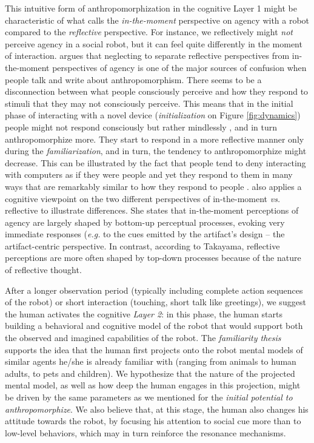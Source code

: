 \documentclass{frontiersSCNS} %
\newcommand{\eg}{\textit{e.g.}\xspace}
\newcommand{\vs}{\textit{vs.}\xspace}
\begin{document}
This intuitive form of anthropomorphization in the cognitive Layer 1 might be
characteristic of what \cite{takayama_perspectives_2012} calls the
\textit{in-the-moment} perspective on agency with a robot compared to the
\textit{reflective} perspective. For instance, we reflectively might
\textit{not} perceive agency in a social robot, but it can feel quite
differently in the moment of interaction. \cite{takayama_perspectives_2012}
argues that neglecting to separate reflective perspectives from in-the-moment
perspectives of agency is one of the major sources of confusion when people talk
and write about anthropomorphism. There seems to be a disconnection between what
people consciously perceive and how they respond to stimuli that they may not
consciously perceive. This means that in the initial phase of interacting with a
novel device (\textit{initialization} on Figure \ref{fig:dynamics}) people
might not respond consciously but rather mindlessly \citep{nass_machines_2000},
and in turn anthropomorphize more. They start to respond in a more reflective
manner only during the \textit{familiarization}, and in turn, the tendency to
anthropomorphize might decrease. This can be illustrated by the fact that
people tend to deny interacting with computers as if they were
people and yet they respond to them in many ways that are remarkably
similar to how they respond to people \citep{reeves_media_1996}.
\cite{takayama_perspectives_2012} also applies a cognitive viewpoint on the two
different perspectives of in-the-moment \vs reflective to illustrate
differences. She states that in-the-moment perceptions of agency are largely
shaped by bottom-up perceptual processes, evoking very immediate responses (\eg
to the cues emitted by the artifact's design -- the artifact-centric
perspective. In contrast, according to Takayama, reflective perceptions are
more often shaped by top-down processes because of the nature of reflective
thought.

After a longer observation period (typically including complete action sequences
of the robot) or short interaction (touching, short talk like greetings), we
suggest the human activates the cognitive \emph{Layer 2}: in this phase, the human
starts building a behavioral and cognitive model of the robot that would support
both the observed and imagined capabilities of the robot.  The \emph{familiarity
thesis}~\citep{hegel_understanding_2008} supports the idea that the human first
projects onto the robot mental models of similar agents he/she is already
familiar with (ranging from animals to human adults, to pets and children). We
hypothesize that the nature of the projected mental model, as well as how deep
the human engages in this projection, might be driven by the same parameters as
we mentioned for the \emph{initial potential to anthropomorphize}. We also believe
that, at this stage, the human also changes his attitude towards the robot, by
focusing his attention to social cue more than to low-level behaviors, which
may in turn reinforce the resonance mechanisms.
\end{document}
